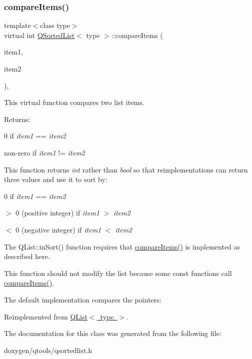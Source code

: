 \subsubsection{\texorpdfstring{compareItems()}{compareItems()}}
{\footnotesize\ttfamily template$<$class type$>$ \\
virtual int \mbox{\hyperlink{class_q_sorted_list}{Q\+Sorted\+List}}$<$ type $>$\+::compare\+Items (\begin{DoxyParamCaption}\item[{Q\+Collection\+::\+Item}]{item1,  }\item[{Q\+Collection\+::\+Item}]{item2 }\end{DoxyParamCaption})\hspace{0.3cm}{\ttfamily [inline]}, {\ttfamily [virtual]}}

This virtual function compares two list items.

Returns\+: 
\begin{DoxyItemize}
\item 0 if {\itshape item1} == {\itshape item2} 
\item non-\/zero if {\itshape item1} != {\itshape item2} 
\end{DoxyItemize}

This function returns {\itshape int} rather than {\itshape bool} so that reimplementations can return three values and use it to sort by\+:


\begin{DoxyItemize}
\item 0 if {\itshape item1} == {\itshape item2} 
\item $>$ 0 (positive integer) if {\itshape item1} $>$ {\itshape item2} 
\item $<$ 0 (negative integer) if {\itshape item1} $<$ {\itshape item2} 
\end{DoxyItemize}

The Q\+List\+::in\+Sort() function requires that \mbox{\hyperlink{class_q_sorted_list_ac668d73e64708886064106eebecf33ae}{compare\+Items()}} is implemented as described here.

This function should not modify the list because some const functions call \mbox{\hyperlink{class_q_sorted_list_ac668d73e64708886064106eebecf33ae}{compare\+Items()}}.

The default implementation compares the pointers\+: 
\begin{DoxyCode}{0}
\end{DoxyCode}
 

Reimplemented from \mbox{\hyperlink{class_q_list}{Q\+List$<$ type $>$}}.



The documentation for this class was generated from the following file\+:\begin{DoxyCompactItemize}
\item 
doxygen/qtools/qsortedlist.\+h\end{DoxyCompactItemize}
